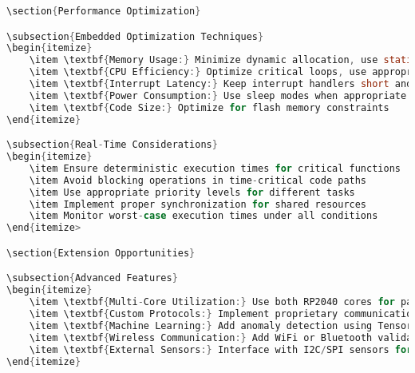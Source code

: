 \documentclass[11pt,a4paper]{article}
\begin{document}
\begin{lstlisting}[language=C]
\section{Performance Optimization}

\subsection{Embedded Optimization Techniques}
\begin{itemize}
    \item \textbf{Memory Usage:} Minimize dynamic allocation, use static buffers
    \item \textbf{CPU Efficiency:} Optimize critical loops, use appropriate data types
    \item \textbf{Interrupt Latency:} Keep interrupt handlers short and fast
    \item \textbf{Power Consumption:} Use sleep modes when appropriate
    \item \textbf{Code Size:} Optimize for flash memory constraints
\end{itemize}

\subsection{Real-Time Considerations}
\begin{itemize}
    \item Ensure deterministic execution times for critical functions
    \item Avoid blocking operations in time-critical code paths
    \item Use appropriate priority levels for different tasks
    \item Implement proper synchronization for shared resources
    \item Monitor worst-case execution times under all conditions
\end{itemize>

\section{Extension Opportunities}

\subsection{Advanced Features}
\begin{itemize}
    \item \textbf{Multi-Core Utilization:} Use both RP2040 cores for parallel testing
    \item \textbf{Custom Protocols:} Implement proprietary communication protocols
    \item \textbf{Machine Learning:} Add anomaly detection using TensorFlow Lite
    \item \textbf{Wireless Communication:} Add WiFi or Bluetooth validation
    \item \textbf{External Sensors:} Interface with I2C/SPI sensors for environmental monitoring
\end{itemize}


\end{lstlisting}
\end{document}

